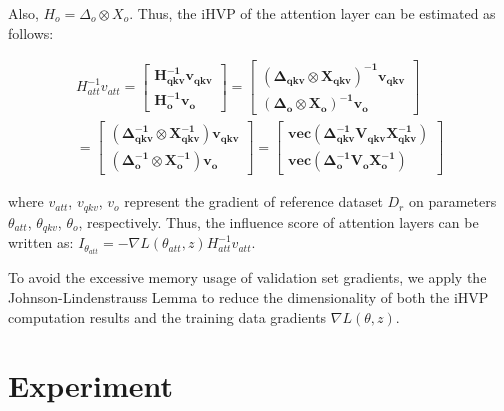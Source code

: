 \documentclass{article} %
\begin{document}
Also, $H_o = \Delta_o \otimes X_o$. Thus, the iHVP of the attention layer can be estimated as follows: 

\begin{equation}
\begin{aligned}
H_{att}^{-1}v_{att} = 
\begin{bmatrix}\mathbf {H_{qkv}^{-1}v_{qkv}} \\ \mathbf{H_o^{-1}v_o}  \end{bmatrix}
= \begin{bmatrix} \mathbf{(\Delta_{qkv} \otimes X_{qkv})^{-1}v_{qkv}} \\ \mathbf{(\Delta_{o} \otimes X_o)^{-1}v_o} \end{bmatrix} \\
= \begin{bmatrix} \mathbf{(\Delta_{qkv}^{-1} \otimes X_{qkv}^{-1})v_{qkv}} \\ \mathbf{(\Delta_{o}^{-1} \otimes X_o^{-1})v_o} \end{bmatrix}
= \begin{bmatrix} \mathbf{vec(\Delta_{qkv}^{-1} V_{qkv} X_{qkv}^{-1})} \\ \mathbf{vec(\Delta_{o}^{-1} V_o X_o^{-1})} \end{bmatrix}
\end{aligned}
\end{equation}

where $v_{att}$, $v_{qkv}$, $v_{o}$ represent the gradient of reference dataset $D_r$ on parameters $\theta_{att}$, $\theta_{qkv}$, $\theta_{o}$, respectively. Thus, the influence score of attention layers can be written as:  $I_{\theta_{att}} = -\nabla L(\theta_{att}, z)H_{att}^{-1}v_{att}$.


To avoid the excessive memory usage of validation set gradients, we apply the Johnson-Lindenstrauss Lemma to reduce the dimensionality of both the iHVP computation results and the training data gradients $\nabla L(\theta,z)$.
\section{Experiment}
\end{document}
